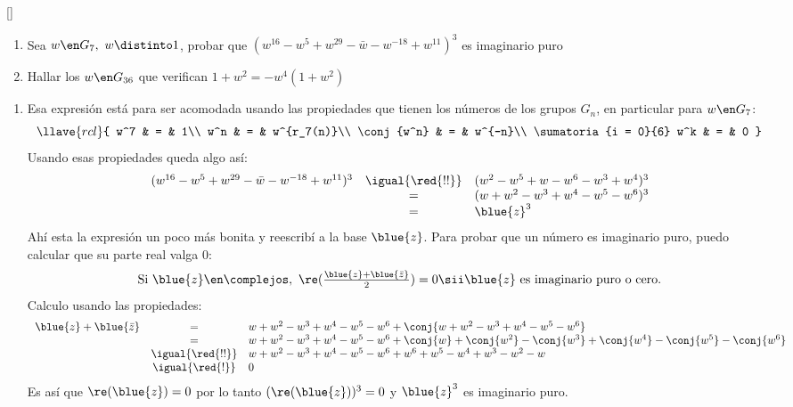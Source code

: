 \begin{enunciado}{\ejExtra}{\tiny[]}
  \begin{enumerate}[label=(\alph*)]
    \item Sea $w \en G_7, ~ w \distinto 1$, probar que
          $(w^{16} - w^5 + w^{29} - \bar{w} - w^{-18} + w^{11})^3$
          es imaginario puro

    \item Hallar los $w \en G_{36}$ que verifican $1 + w^2 = - w^4(1 + w^2)$
  \end{enumerate}
\end{enunciado}

\begin{enumerate}[label=(\alph*)]
  \item Esa expresión está para ser acomodada usando las propiedades que tienen los números de los grupos $G_n$,
        en particular para $w \en G_7$:
        $$
          \llave{rcl}{
            w^7 & = & 1\\
            w^n & = & w^{r_7(n)}\\
            \conj{w^n} & = & w^{-n}\\
            \sumatoria{i = 0}{6} w^k & = & 0
          }
        $$
        Usando esas propiedades queda algo así:
        $$
          \begin{array}{rcl}
            (w^{16} - w^5 + w^{29} - \bar{w} - w^{-18} + w^{11})^3
             & \igual{\red{!!}} &
            (w^2 - w^5 + w - w^6 - w^3 + w^4)^3 \\
             & =                &
            (w + w^2 - w^3 + w^4 - w^5 - w^6)^3 \\
             & =                &
            \blue{z}^3                          \\
          \end{array}
        $$
        Ahí esta la expresión un poco más bonita y reescribí a la base $\blue{z}$. Para probar que un número es imaginario puro,
        puedo calcular que su parte real valga 0:
        $$
          \textstyle
          \text{Si } \blue{z} \en \complejos,~ \re(\frac{\blue{z} + \blue{\bar{z}}}{2}) = 0
          \sii
          \blue{z} \text{ es imaginario puro o cero}.
        $$
        Calculo usando las propiedades:
        $$
          \begin{array}{rcl}
            \blue{z} + \blue{\bar{z}}
             & =                &
            w + w^2 - w^3 + w^4 - w^5 - w^6 + \conj{w + w^2 - w^3 + w^4 - w^5 - w^6}                                    \\
             & =                &
            w + w^2 - w^3 + w^4 - w^5 - w^6 + \conj{w} + \conj{w^2} - \conj{w^3} + \conj{w^4} - \conj{w^5} - \conj{w^6} \\
             & \igual{\red{!!}} &
            w + w^2 - w^3 + w^4 - w^5 - w^6 + w^6 + w^5 - w^4 + w^3 - w^2 - w                                           \\
             & \igual{\red{!}}  &
            0
          \end{array}
        $$
        Es así que $\re(\blue{z}) = 0$ por lo tanto $(\re(\blue{z}))^3 = 0$ y $\blue{z}^3$ es imaginario puro.


\end{enumerate}
